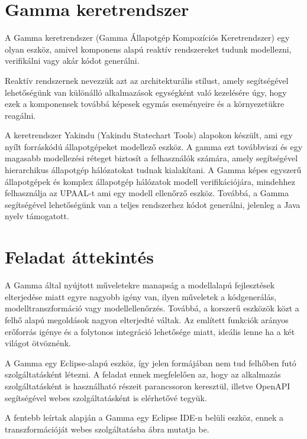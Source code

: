 \section{Gamma keretrendszer}
A Gamma keretrendszer\cite{DBLP:journals/sosym/GraicsMVMV20} (Gamma Állapotgép Kompozíciós Keretrendszer) egy olyan eszköz, amivel komponens alapú reaktív rendszereket tudunk modellezni, verifikálni vagy akár kódot generálni.

Reaktív rendszernek nevezzük azt az architekturális stílust, amely segítségével lehetőségünk van különálló alkalmazások egységként való kezelésére úgy, hogy ezek a komponensek továbbá képesek egymás eseményeire és a környezetükre reagálni.

A keretrendszer Yakindu (Yakindu Statechart Tools) alapokon készült, ami egy nyílt forráskódú állapotgépeket modellező eszköz. A gamma ezt továbbviszi és egy magasabb modellezési réteget biztosít a felhasználók számára, amely segítségével hierarchikus állapotgép hálózatokat tudnak kialakítani. A Gamma képes egyszerű állapotgépek és komplex állapotgép hálózatok modell verifikációjára, mindehhez felhasználja az UPAAL-t ami egy modell ellenőrző eszköz. Továbbá, a Gamma segítségével lehetőségünk van a teljes rendszerhez kódot generálni, jelenleg a Java nyelv támogatott.

\section{Feladat áttekintés}

A Gamma által nyújtott műveletekre manapság a modellalapú fejlesztések elterjedése miatt egyre nagyobb igény van, ilyen műveletek a kódgenerálás, modelltranszformáció vagy modellellenőrzés. Továbbá, a korszerű eszközök közt a felhő alapú megoldások nagyon elterjedté váltak. Az említett funkciók arányos erőforrás igénye és a folytonos integráció lehetősége miatt, ideális lenne ha a két világot ötvöznénk.


A Gamma egy Eclipse-alapú eszköz, így jelen formájában nem tud felhőben futó szolgáltatásként létezni. A feladat ennek megfelelően az, hogy az alkalmazás szolgáltatásként is használható részeit parancssoron keresztül, illetve OpenAPI segítségével webes szolgáltatásként is elérhetővé tegyük.

A fentebb leírtak alapján a Gamma egy Eclipse IDE-n belüli eszköz, ennek a transzformációját webes szolgáltatásba  ábra mutatja be.

